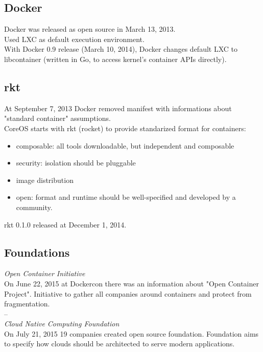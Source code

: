 \documentclass{beamer}
\begin{document}
\subsection{Docker}
\begin{frame}
Docker was released as open source in March 13, 2013. \\
\pause
Used LXC as default execution environment. \\
\pause
With Docker 0.9 release (March 10, 2014), Docker changes default LXC to libcontainer (written in Go, to access kernel's container APIs directly).
\end{frame}

\subsection{rkt}
\begin{frame}
At September 7, 2013 Docker removed manifest with informations about "standard container" assumptions. \\
CoreOS starts with rkt (rocket) to provide standarized format for containers:
\pause
\begin{itemize}
\item composable: all tools downloadable, but independent and composable
\pause
\item security: isolation should be pluggable
\pause
\item image distribution
\pause
\item open: format and runtime should be well-specified and developed by a community.
\end{itemize}
\pause
rkt 0.1.0 released at December 1, 2014.
\end{frame}

\subsection{Foundations}
\begin{frame}
\textit{Open Container Initiative} \\
On June 22, 2015 at Dockercon there was an information about "Open Container Project". Initiative to gather all companies around containers and protect from fragmentation. \\
--  \\
\textit{Cloud Native Computing Foundation} \\
On July 21, 2015 19 companies created open source foundation. Foundation aims to specify how clouds should be architected to serve modern applications.
\end{frame}
\end{document}
